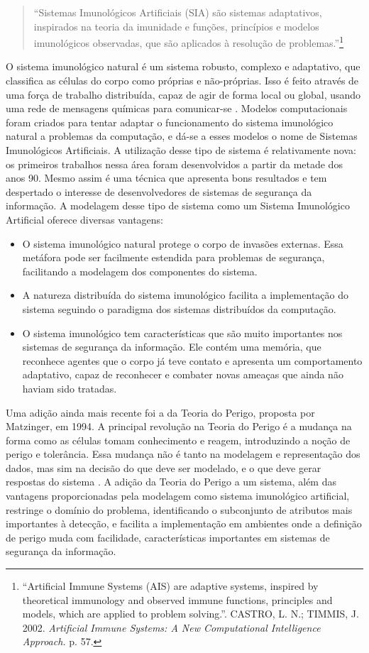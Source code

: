 \begin{quote}
``Sistemas Imunológicos Artificiais (SIA) são sistemas adaptativos, inspirados na teoria da imunidade e funções, princípios e modelos imunológicos observadas, que são aplicados à resolução de problemas.''\footnote{``Artificial Immune Systems (AIS) are adaptive systems, inspired by theoretical immunology and observed immune functions, principles and models, which are applied to problem solving.''. CASTRO, L. N.; TIMMIS, J. 2002. \emph{Artificial Immune Systems: A New Computational Intelligence Approach.} p. 57.}
\end{quote}

O sistema imunológico natural é um sistema robusto, complexo e adaptativo, que classifica as células do corpo como próprias e não-próprias. Isso é feito através de uma força de trabalho distribuída, capaz de agir de forma local ou global, usando uma rede de mensagens químicas para comunicar-se \cite{Aickelin2005}. Modelos computacionais foram criados para tentar adaptar o funcionamento do sistema imunológico natural a problemas da computação, e dá-se a esses modelos o nome de Sistemas Imunológicos Artificiais. A utilização desse tipo de sistema é relativamente nova: os primeiros trabalhos nessa área foram desenvolvidos a partir da metade dos anos 90. Mesmo assim é uma técnica que apresenta bons resultados e tem despertado o interesse de desenvolvedores de sistemas de segurança da informação. A modelagem desse tipo de sistema como um Sistema Imunológico Artificial oferece diversas vantagens:

\begin{itemize}
\item O sistema imunológico natural protege o corpo de invasões externas. Essa metáfora pode ser facilmente estendida para problemas de segurança, facilitando a modelagem dos componentes do sistema.
\item A natureza distribuída do sistema imunológico facilita a implementação do sistema seguindo o paradigma dos sistemas distribuídos da computação.
\item O sistema imunológico tem características que são muito importantes nos sistemas de segurança da informação. Ele contém uma memória, que reconhece agentes que o corpo já teve contato e apresenta um comportamento adaptativo, capaz de reconhecer e combater novas ameaças que ainda não haviam sido tratadas.
\end{itemize}

Uma adição ainda mais recente foi a da Teoria do Perigo, proposta por Matzinger, em 1994. A principal revolução na Teoria do Perigo é a mudança na forma como as células tomam conhecimento e reagem, introduzindo a noção de perigo e tolerância. Essa mudança não é tanto na modelagem e representação dos dados, mas sim na decisão do que deve ser modelado, e o que deve gerar respostas do sistema \cite{Aickelin2005}. A adição da Teoria do Perigo a um sistema, além das vantagens proporcionadas pela modelagem como sistema imunológico artificial, restringe o domínio do problema, identificando o subconjunto de atributos mais importantes à detecção, e facilita a implementação em ambientes onde a definição de perigo muda com facilidade, características importantes em sistemas de segurança da informação.

